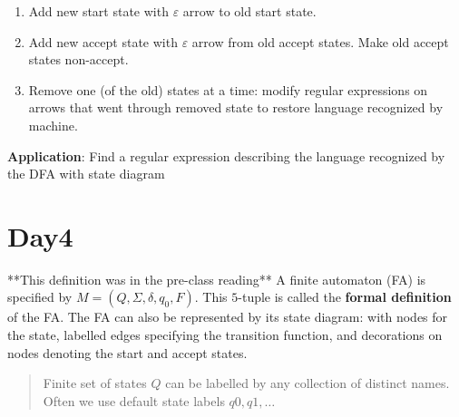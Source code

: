 \documentclass[12pt, oneside]{article}
\begin{document}
\begin{enumerate}
\item Add new start state with $\varepsilon$ arrow to old start state.
\item Add new accept state with $\varepsilon$ arrow from old accept states.  Make old accept states
non-accept.
\item Remove one (of the old) states at a time: modify regular expressions on arrows that went through removed
state to restore language recognized by machine.
\end{enumerate}

{\bf Application}: Find a regular expression describing the language recognized by the DFA with 
state diagram


\vfill \vfill
\section*{Day4}



**This definition was in the pre-class reading**
A finite automaton (FA) is specified by  $M = (Q, \Sigma, \delta, q_0, F)$.
This $5$-tuple is called the {\bf formal definition} of the FA. The FA can also 
be represented by its state diagram: with nodes for the state, labelled edges specifying the 
transition function, and decorations on nodes denoting the start and accept states.

\begin{quote}
Finite set of states $Q$ can be labelled by any collection of distinct names. Often
we use default state labels $q0, q1, \ldots$ 
\end{quote}
\end{document}
